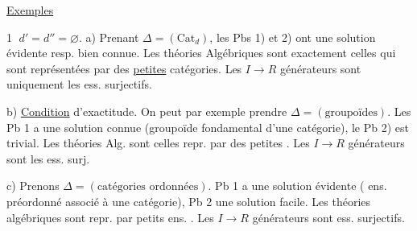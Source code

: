 \uline{Exemples}

\textcircled{1} $d'=d''=\varnothing$.  a) Prenant $\Delta=(\mathrm{Cat}_d)$, les Pbs 1) et 2) ont une solution évidente resp. bien connue. Les théories Algébriques sont exactement celles qui sont représentées par des \uline{petites} catégories. Les $I\longrightarrow R$ générateurs sont uniquement les ess. surjectifs.

b) \uline{Condition} d'exactitude. On peut par exemple prendre \uline{$\Delta=(\text{groupoïdes})$}.
Les  Pb 1 a une solution connue (groupoïde fondamental d'une catégorie), le Pb 2) est trivial. Les théories Alg. sont celles repr. par des petites  . Les $I\longrightarrow R$ générateurs sont les ess. surj.

c) Prenons $\Delta=(\text{catégories ordonnées})$. Pb 1 a une solution évidente ( ens. préordonné associé à une catégorie), Pb 2 une solution facile.
Les théories algébriques sont  repr. par petits ens. . Les $I\longrightarrow R$ générateurs sont ess. surjectifs.
